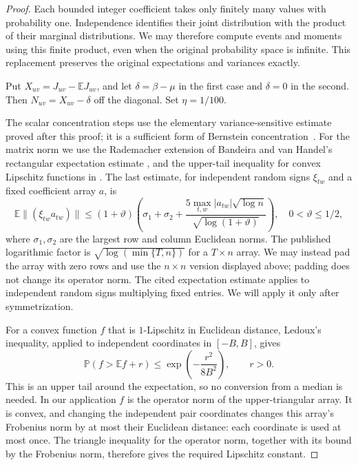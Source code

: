 \documentclass[11pt,a4paper]{article}
\theoremstyle{definition}
\theoremstyle{remark}
\newcommand{\E}{\mathbb E}
\newcommand{\Prb}{\mathbb P}
\begin{document}
\begin{proof}
Each bounded integer coefficient takes only finitely many values with
probability one. Independence identifies their joint distribution with
the product of their marginal distributions. We may therefore compute
events and moments using this finite product, even when the original
probability space is infinite. This replacement preserves the original
expectations and variances exactly.

Put $X_{uv}=J_{uv}-\E J_{uv}$, and let $\delta=\beta-\mu$ in the first
case and $\delta=0$ in the second. Then $N_{uv}=X_{uv}-\delta$ off the
diagonal. Set $\eta=1/100$.

The scalar concentration steps use the elementary variance-sensitive
estimate proved after this proof; it is a sufficient form of Bernstein
concentration~\cite{BLM13}. For the matrix norm we use the Rademacher
extension of Bandeira and van Handel's rectangular expectation estimate
\cite[Theorem~3.1, Corollary~3.2, and the paragraph following it]{BvH16},
and the upper-tail inequality for convex Lipschitz functions in
\cite[Corollary~3.3 and its interval rescaling, pp.~165--166]{Ledoux99}.
The last estimate, for independent random signs $\xi_{tw}$ and a fixed
coefficient array $a$, is
\[
 \E\|(\xi_{tw}a_{tw})\|
 \le(1+\vartheta)\left(\sigma_1+\sigma_2+
       \frac{5\max_{t,w}|a_{tw}|\sqrt{\log n}}
            {\sqrt{\log(1+\vartheta)}}\right),\quad
 0<\vartheta\le1/2,
\]
where $\sigma_1,\sigma_2$ are the largest row and column Euclidean norms.
The published logarithmic factor is $\sqrt{\log(\min\{T,n\})}$ for a
$T\times n$ array. We may instead pad the array with zero rows and use the
$n\times n$ version displayed above; padding does not change its operator
norm. The cited expectation estimate applies to independent random signs
multiplying fixed entries. We will apply it only after symmetrization.

For a convex function $f$ that is $1$-Lipschitz in Euclidean distance,
Ledoux's inequality, applied to independent coordinates in $[-B,B]$, gives
\[
 \Prb(f>\E f+r)\le \exp\!\left(-\frac{r^2}{8B^2}\right),\qquad r>0.
\]
This is an upper tail around the expectation, so no conversion from a
median is needed. In our application $f$ is the operator norm of the
upper-triangular array. It is convex, and changing the independent pair
coordinates changes this array's Frobenius norm by at most their Euclidean
distance: each coordinate is used at most once. The triangle inequality
for the operator norm, together with its bound by the Frobenius norm,
therefore gives the required Lipschitz constant.


\end{proof}
\end{document}
